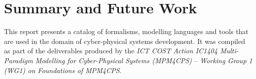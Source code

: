 \documentclass[final]{include/MPM4CPS/MPM4CPS-Report} %
\newcommand{\COMMENT}[2][N.N.]{\todo[color=yellow]{\tiny COMMENT[#1]: #2}}
\begin{document}




%

\chapter{Summary and Future Work}
%

This report presents a catalog of formalisms, modelling languages and tools that are used in the domain of cyber-physical systems development.
It was compiled as part of the deliverables produced by the \emph{ICT COST Action IC1404 Multi-Paradigm Modelling for Cyber-Physical Systems (MPM4CPS)} -- \emph{Working Group 1 (WG1) on Foundations of MPM4CPS}.
\end{document}
